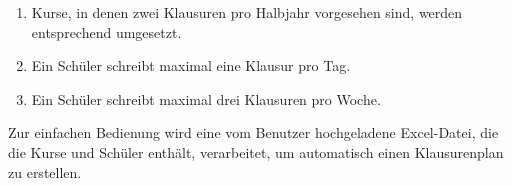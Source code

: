 \begin{enumerate} 

\item Kurse, in denen zwei Klausuren pro Halbjahr vorgesehen sind, werden entsprechend umgesetzt. 

\item Ein Schüler schreibt maximal eine Klausur pro Tag. 

\item Ein Schüler schreibt maximal drei Klausuren pro Woche. 

\end{enumerate}
Zur einfachen Bedienung wird eine vom Benutzer hochgeladene Excel-Datei, die die Kurse und Schüler enthält, verarbeitet, um automatisch einen Klausurenplan zu erstellen.
